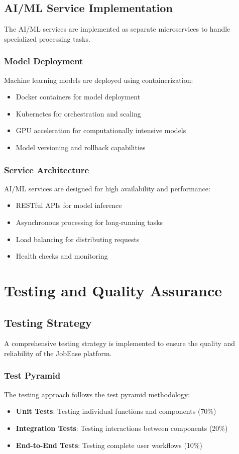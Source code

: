 \documentclass[12pt,a4paper]{report}
\begin{document}
\section{AI/ML Service Implementation}
The AI/ML services are implemented as separate microservices to handle specialized processing tasks.

\subsection{Model Deployment}
Machine learning models are deployed using containerization:
\begin{itemize}[leftmargin=2em]
  \item Docker containers for model deployment
  \item Kubernetes for orchestration and scaling
  \item GPU acceleration for computationally intensive models
  \item Model versioning and rollback capabilities
\end{itemize}

\subsection{Service Architecture}
AI/ML services are designed for high availability and performance:
\begin{itemize}[leftmargin=2em]
  \item RESTful APIs for model inference
  \item Asynchronous processing for long-running tasks
  \item Load balancing for distributing requests
  \item Health checks and monitoring
\end{itemize}

\chapter{Testing and Quality Assurance}

\section{Testing Strategy}
A comprehensive testing strategy is implemented to ensure the quality and reliability of the JobEase platform.

\subsection{Test Pyramid}
The testing approach follows the test pyramid methodology:
\begin{itemize}[leftmargin=2em]
  \item \textbf{Unit Tests}: Testing individual functions and components (70\%)
  \item \textbf{Integration Tests}: Testing interactions between components (20\%)
  \item \textbf{End-to-End Tests}: Testing complete user workflows (10\%)
\end{itemize}
\end{document}
